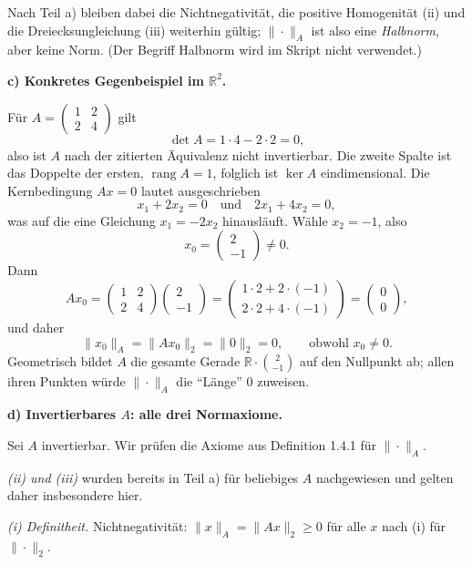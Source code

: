 \documentclass[a4paper,11pt]{article}
\begin{document}
Nach Teil a) bleiben dabei die Nichtnegativität, die positive Homogenität (ii) und die Dreiecksungleichung (iii) weiterhin gültig; $\|\cdot\|_A$ ist also eine \emph{Halbnorm}, aber keine Norm. (Der Begriff Halbnorm wird im Skript nicht verwendet.)

\bigskip
\textbf{c) Konkretes Gegenbeispiel im $\mathbb{R}^2$.}

Für $A=\begin{pmatrix}1&2\\2&4\end{pmatrix}$ gilt
\[
\det A = 1\cdot 4 - 2\cdot 2 = 0 ,
\]
also ist $A$ nach der zitierten Äquivalenz nicht invertierbar. Die zweite Spalte ist das Doppelte der ersten, $\operatorname{rang}A=1$, folglich ist $\ker A$ eindimensional. Die Kernbedingung $Ax=0$ lautet ausgeschrieben
\[
x_1+2x_2=0 \quad\text{und}\quad 2x_1+4x_2=0 ,
\]
was auf die eine Gleichung $x_1=-2x_2$ hinausläuft. Wähle $x_2=-1$, also
\[
x_0=\begin{pmatrix}2\\-1\end{pmatrix}\neq 0 .
\]
Dann
\[
Ax_0=\begin{pmatrix}1&2\\2&4\end{pmatrix}\begin{pmatrix}2\\-1\end{pmatrix}
=\begin{pmatrix}1\cdot 2+2\cdot(-1)\\[2pt]2\cdot 2+4\cdot(-1)\end{pmatrix}
=\begin{pmatrix}0\\0\end{pmatrix},
\]
und daher
\[
\|x_0\|_A=\|Ax_0\|_2=\|0\|_2=0 ,\qquad\text{obwohl } x_0\neq 0 .
\]
Geometrisch bildet $A$ die gesamte Gerade $\mathbb{R}\cdot\binom{2}{-1}$ auf den Nullpunkt ab; allen ihren Punkten würde $\|\cdot\|_A$ die ``Länge'' $0$ zuweisen.

\bigskip
\textbf{d) Invertierbares $A$: alle drei Normaxiome.}

Sei $A$ invertierbar. Wir prüfen die Axiome aus Definition 1.4.1 für $\|\cdot\|_A$.

\emph{(ii) und (iii)} wurden bereits in Teil a) für beliebiges $A$ nachgewiesen und gelten daher insbesondere hier.

\emph{(i) Definitheit.} Nichtnegativität: $\|x\|_A=\|Ax\|_2\ge 0$ für alle $x$ nach (i) für $\|\cdot\|_2$.
\end{document}
